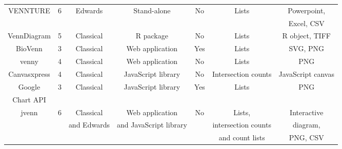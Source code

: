 \documentclass{bmcart}
\begin{document}
\begin{backmatter}
\begin{table}[h!]
\begin{tabular}{c|cccccc}
		VENNTURE \cite{Bronwen2012} &  6 & Edwards & Stand-alone & No & Lists &
		Powerpoint,\\ 
		& & & & & & Excel, CSV \\ \hline
		
		VennDiagram \cite{RVennDiagram} &  5 & Classical & R package & No & Lists
		& R object, TIFF \\ \hline
		
		BioVenn \cite{Hulsen2008} &  3 & Classical & Web application & Yes &
		Lists & SVG, PNG \\ \hline
		
		venny \cite{venny} &  4 & Classical & Web application & No &
		Lists & PNG \\ \hline
		 
		Canvasxpress \cite{canvasxpress} &  4 & Classical & JavaScript library &
		No & Intersection counts & JavaScript canvas \\ \hline
		
		Google & 3 & Classical & JavaScript library &
		Yes & Lists & PNG \\ 
		Chart API \cite{googleAPI} & & & & & & \\ \hline
			
		jvenn & 6 & Classical & Web application & No & Lists,
		& Interactive 
		\\
		& & and Edwards & and JavaScript library & & intersection counts & diagram, \\
		& & & & & and count lists & PNG, CSV
	\end{tabular}
\end{table}




\end{backmatter}
\end{document}
